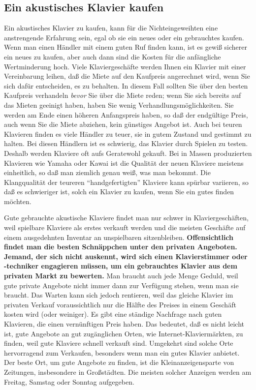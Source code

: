 
\subsection{Ein akustisches Klavier kaufen}
\label{c1iii17e}

Ein akustisches Klavier zu kaufen, kann für die Nichteingeweihten eine anstrengende Erfahrung sein, egal ob sie ein neues oder ein gebrauchtes kaufen.
Wenn man einen Händler mit einem guten Ruf finden kann, ist es gewiß sicherer ein neues zu kaufen, aber auch dann sind die Kosten für die anfängliche Wertminderung hoch.
Viele Klaviergeschäfte werden Ihnen ein Klavier mit einer Vereinbarung leihen, daß die Miete auf den Kaufpreis angerechnet wird, wenn Sie sich dafür entscheiden, es zu behalten.
In diesem Fall sollten Sie über den besten Kaufpreis verhandeln \textit{bevor} Sie über die Miete reden; wenn Sie sich bereits auf das Mieten geeinigt haben, haben Sie wenig Verhandlungsmöglichkeiten.
Sie werden am Ende einen höheren Anfangspreis haben, so daß der endgültige Preis, auch wenn Sie die Miete abziehen, kein günstiges Angebot ist.
Auch bei teuren Klavieren finden es viele Händler zu teuer, sie in gutem Zustand und gestimmt zu halten.
Bei diesen Händlern ist es schwierig, das Klavier durch Spielen zu testen.
Deshalb werden Klaviere oft aufs Geratewohl gekauft.
Bei in Massen produzierten Klavieren wie Yamaha oder Kawai ist die Qualität der neuen Klaviere meistens einheitlich, so daß man ziemlich genau weiß, was man bekommt.
Die Klangqualität der teureren \enquote{handgefertigten} Klaviere kann spürbar variieren, so daß es schwieriger ist, solch ein Klavier zu kaufen, wenn Sie ein gutes finden möchten.

Gute gebrauchte akustische Klaviere findet man nur schwer in Klaviergeschäften, weil spielbare Klaviere als erstes verkauft werden und die meisten Geschäfte auf einem ausgedehnten Inventar an unspielbaren sitzenbleiben.
\textbf{Offensichtlich findet man die besten Schnäppchen unter den privaten Angeboten.
Jemand, der sich nicht auskennt, wird sich einen Klavierstimmer oder -techniker engagieren müssen, um ein gebrauchtes Klavier aus dem privaten Markt zu bewerten.}
Man braucht auch jede Menge Geduld, weil gute private Angebote nicht immer dann zur Verfügung stehen, wenn man sie braucht.
Das Warten kann sich jedoch rentieren, weil das gleiche Klavier im privaten Verkauf voraussichtlich nur die Hälfte des Preises in einem Geschäft kosten wird (oder weiniger).
Es gibt eine ständige Nachfrage nach guten Klavieren, die einen vernünftigen Preis haben.
Das bedeutet, daß es nicht leicht ist, gute Angebote an gut zugänglichen Orten, wie Internet-Klaviermärkten, zu finden, weil gute Klaviere schnell verkauft sind.
Umgekehrt sind solche Orte hervorragend zum Verkaufen, besonders wenn man ein gutes Klavier anbietet.
Der beste Ort, um gute Angebote zu finden, ist die Kleinanzeigensparte von Zeitungen, insbesondere in Großstädten.
Die meisten solcher Anzeigen werden am Freitag, Samstag oder Sonntag aufgegeben.

